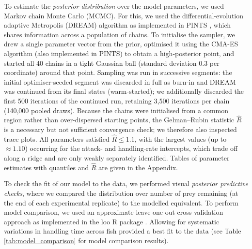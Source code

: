 \documentclass[ASNA,twocolumn]{USG} %
\begin{document}
To estimate the \textit{posterior distribution} over the model parameters, we used Markov chain Monte Carlo (MCMC). For this, we used the differential-evolution adaptive Metropolis (DREAM) algorithm as implemented in PINTS \citep{michaelclerxProbabilisticInferenceNoisy2019}, which shares information across a population of chains. To initialise the sampler, we drew a single parameter vector from the prior, optimised it using the CMA-ES algorithm (also implemented in PINTS) to obtain a high-posterior point, and started all 40 chains in a tight Gaussian ball (standard deviation 0.3 per coordinate) around that point. Sampling was run in successive segments: the initial optimiser-seeded segment was discarded in full as burn-in and DREAM was continued from its final states (warm-started); we additionally discarded the first 500 iterations of the continued run, retaining 3{,}500 iterations per chain (140{,}000 pooled draws). Because the chains were initialised from a common region rather than over-dispersed starting points, the Gelman--Rubin statistic \begin{math}\hat{R}\end{math} \citep{vehtariPracticalBayesianModel2017} is a necessary but not sufficient convergence check; we therefore also inspected trace plots. All parameters satisfied \begin{math}\hat{R} \leq 1.1\end{math}, with the largest values (up to \begin{math}\approx 1.10\end{math}) occurring for the attack- and handling-rate intercepts, which trade off along a ridge and are only weakly separately identified. Tables of parameter estimates with quantiles and $\hat{R}$ are given in the Appendix.



To check the fit of our model to the data, we performed visual \textit{posterior predictive checks}, where we compared the distribution over number of prey remaining (at the end of each experimental replicate) to the modelled equivalent. To perform model comparison, we used an approximate leave-one-out-cross-validation approach as implemented in the loo R package \citep{vehtariPracticalBayesianModel2017}. Allowing for systematic variations in handling time across fish provided a best fit to the data (see Table \ref{tab:model_comparison} for model comparison results). 
\end{document}
